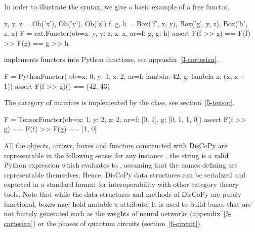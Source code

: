 \begin{example}
In order to illustrate the syntax, we give a basic example of a free functor.
\normalfont
\begin{python}
x, y, z = Ob('x'), Ob('y'), Ob('z')
f, g, h = Box('f', x, y), Box('g', y, z), Box('h', z, x)
F = cat.Functor(ob={x: y, y: z, z: x}, ar={f: g, g: h})
assert F(f >> g) == F(f) >> F(g) == g >> h
\end{python}
\end{example}

\begin{example}
 implements functors into Python functions, see
appendix~\ref{3-cartesian}.
\normalfont
\begin{python}
F = PythonFunctor(
    ob={x: 0, y: 1, z: 2}, ar={f: lambda: 42, g: lambda x: (x, x + 1)})
assert F(f >> g)() == (42, 43)
\end{python}
\end{example}

\begin{example}
The category of matrices is implemented by the  class, see
section~\ref{5-tensor}.
\normalfont
\begin{python}
F = TensorFunctor(ob={x: 1, y: 2, z: 2}, ar={f: [0, 1], g: [0, 1, 1, 0]})
assert F(f >> g) == F(f) >> F(g) == [1, 0]
\end{python}
\end{example}

All the objects, arrows, boxes and functors constructed with DisCoPy are representable in the following sense: for any instance , the string  is a valid Python expression which evaluates to , assuming that the names defining  are representable themselves.
Hence, DisCoPy data structures can be serialized and exported in a standard format \cite{Statebox20} for interoperability with other category theory tools.
Note that while the data structures and methods of DisCoPy are purely functional, boxes may hold mutable a  attribute.
It is used to build boxes that are not finitely generated such as the weights of neural networks (appendix~\ref{3-cartesian}) or the phases of quantum circuits (section~\ref{6-circuit}).

